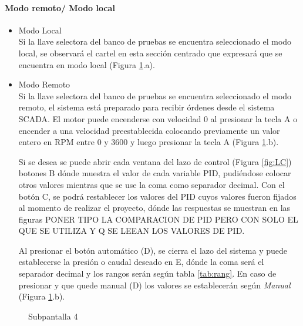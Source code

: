 \paragraph{Modo remoto/ Modo local}
\begin{itemize}
	\item Modo Local\\
	Si la llave selectora del banco de pruebas se encuentra seleccionado el modo local, se observará el cartel en esta sección centrado que expresará que se encuentra en modo local (Figura \ref{fig:localremoto}.a).
	\item Modo Remoto\\
	Si la llave selectora del banco de pruebas se encuentra seleccionado el modo remoto, el sistema está preparado para recibir órdenes desde el sistema SCADA. El motor puede encenderse con velocidad 0 al presionar la tecla A o encender a una velocidad preestablecida colocando previamente un valor entero en RPM entre 0 y 3600 y luego presionar la tecla A (Figura \ref{fig:localremoto}.b). 
	
	Si se desea se puede abrir cada ventana del lazo de control (Figura \ref{fig:LC}) botones B dónde muestra el valor de cada variable PID, pudiéndose colocar otros valores mientras que se use la coma como separador decimal. Con el botón C, se podrá restablecer los valores del PID cuyos valores fueron fijados al momento de realizar el proyecto, dónde las respuestas se muestran en las figuras PONER TIPO LA COMPARACION DE PID PERO CON SOLO EL QUE SE UTILIZA Y Q SE LEEAN LOS VALORES DE PID. 
	
	Al presionar el botón automático (D), se cierra el lazo del sistema y puede establecerse la presión o caudal deseado en E, dónde la coma será el separador decimal y los rangos serán según tabla \ref{tab:rang}. En caso de presionar y que quede manual (D) los valores se establecerán según \textit{Manual} (Figura \ref{fig:localremoto}.b). 
\end{itemize}

\begin{figure}[htbp]
	\centering
	\caption{Subpantalla 4} \label{fig:localremoto}
\end{figure}

